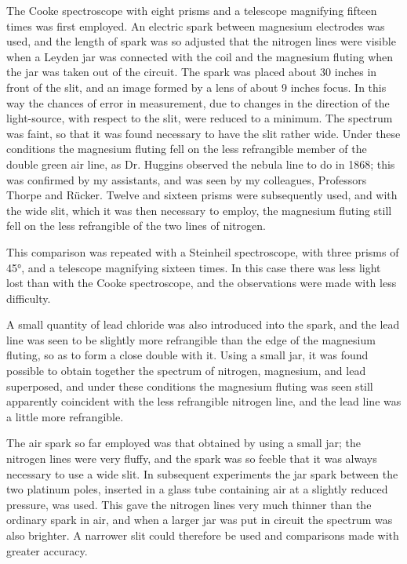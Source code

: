 \documentclass[a4paper, 12pt, oneside, polutonikogreek, english]{article}
\begin{document}
The Cooke spectroscope with eight prisms and a telescope magnifying fifteen times was first employed. An electric spark between magnesium electrodes was used, and the length of spark was so adjusted that the nitrogen lines were visible when a Leyden jar was connected with the coil and the magnesium fluting when the jar was taken out of the circuit. The spark was placed about 30 inches in front of the slit, and an image formed by a lens of about 9 inches focus. In this way the chances of error in measurement, due to changes in the direction of the light-source, with respect to the slit, were reduced to a minimum. The spectrum was faint, so that it was found necessary to have the slit rather wide. Under these conditions the magnesium fluting fell on the less refrangible member of the double green air line, as Dr. Huggins observed the nebula line to do in 1868; this was confirmed by my assistants, and was seen by my colleagues, Professors Thorpe and Rücker. Twelve and sixteen prisms were subsequently used, and with the wide slit, which it was then necessary to employ, the magnesium fluting still fell on the less refrangible of the two lines of nitrogen.

This comparison was repeated with a Steinheil spectroscope, with three prisms of 45°, and a telescope magnifying sixteen times. In this case there was less light lost than with the Cooke spectroscope, and the observations were made with less difficulty.

A small quantity of lead chloride was also introduced into the spark, and the lead line was seen to be slightly more refrangible than the edge of the magnesium fluting, so as to form a close double with it. Using a small jar, it was found possible to obtain together the spectrum of nitrogen, magnesium, and lead superposed, and under these conditions the magnesium fluting was seen still apparently coincident with the less refrangible nitrogen line, and the lead line was a little more refrangible.

The air spark so far employed was that obtained by using a small jar; the nitrogen lines were very fluffy, and the spark was so feeble that it was always necessary to use a wide slit. In subsequent experiments the jar spark between the two platinum poles, inserted in a glass tube containing air at a slightly reduced pressure, was used. This gave the nitrogen lines very much thinner than the ordinary spark in air, and when a larger jar was put in circuit the spectrum was also brighter. A narrower slit could therefore be used and comparisons made with greater accuracy.
\end{document}
